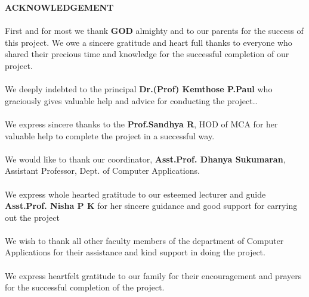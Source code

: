\documentclass[a4paper, 12pt]{report}
\begin{document}
\newpage
\begin{titlepage}
{\fontsize{16pt}{16pt}\selectfont\bfseries\center ACKNOWLEDGEMENT \par}
	\paragraph{}  {\fontsize{14pt}{14pt}\selectfont
First and for most we thank \textbf{GOD} almighty and to our parents for the success of this project. We owe a sincere gratitude and heart full thanks to everyone who shared their precious time and knowledge for the successful completion of our project.
\paragraph{}We deeply indebted to the principal\textbf{ Dr.(Prof) Kemthose P.Paul} who graciously gives valuable help and advice for conducting the project..\paragraph{}
We express sincere thanks to the  \textbf{Prof.Sandhya R}, HOD of MCA for her valuable help to complete the project in a successful way.\paragraph{}We would like to thank our coordinator,\textbf{ Asst.Prof. Dhanya Sukumaran}, Assistant Professor, Dept. of Computer Applications.\paragraph{}
We express  whole hearted gratitude to our esteemed lecturer and guide \textbf{Asst.Prof. Nisha P K} for her sincere guidance and good support for carrying out the project

\paragraph{}We wish to thank all other faculty members of the department of Computer Applications for their assistance and kind support in doing the project.
\paragraph{}We express heartfelt gratitude to our family for their encouragement and prayers for the successful completion of the project.
}
\end{titlepage}
\end{document}
